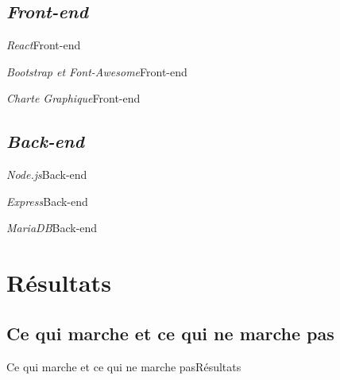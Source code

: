 \documentclass[usenames,dvipsnames]{beamer}
\begin{document}
\subsection{\protect\textit{Front-end}}
\begin{frame}{\textit{React}}{Front-end}

\end{frame}

\begin{frame}{\textit{Bootstrap et Font-Awesome}}{Front-end}

\end{frame}

\begin{frame}{\textit{Charte Graphique}}{Front-end}

\end{frame}

\subsection{\protect\textit{Back-end}}
\begin{frame}{\textit{Node.js}}{Back-end}

\end{frame}

\begin{frame}{\textit{Express}}{Back-end}

\end{frame}

\begin{frame}{\textit{MariaDB}}{Back-end}

\end{frame}
\section{Résultats}
\subsection{Ce qui marche et ce qui ne marche pas}
\begin{frame}{Ce qui marche et ce qui ne marche pas}{Résultats}

\end{frame}
\end{document}
